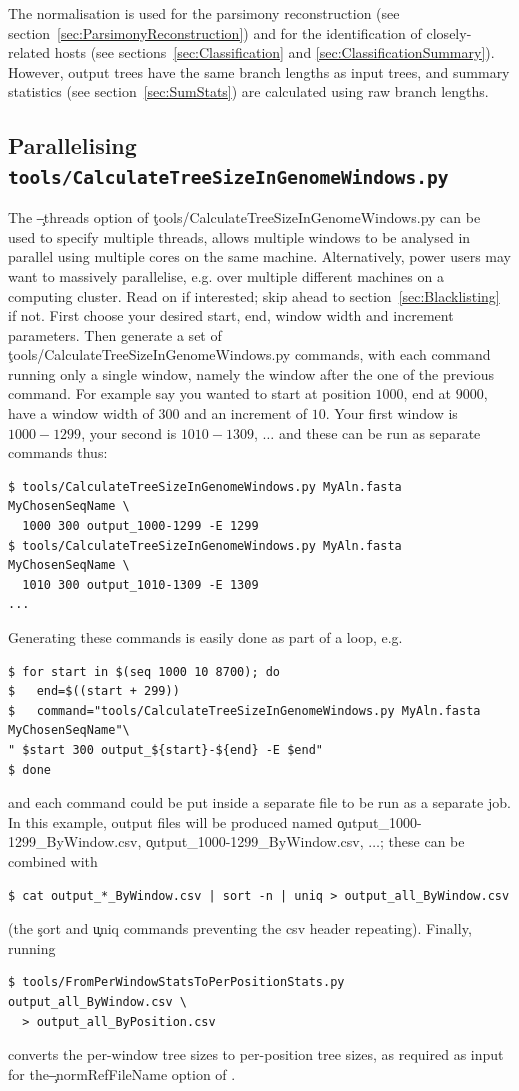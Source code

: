 The normalisation is used for the parsimony reconstruction (see section~\ref{sec:ParsimonyReconstruction}) and for the identification of closely-related hosts (see sections~\ref{sec:Classification} and \ref{sec:ClassificationSummary}). However, output trees have the same branch lengths as input trees, and summary statistics (see section~\ref{sec:SumStats}) are calculated using raw branch lengths.

\subsection{Parallelising \texttt{tools/CalculateTreeSizeInGenomeWindows.py}}
The \c{--threads} option of \c{tools/CalculateTreeSizeInGenomeWindows.py} can be used to specify multiple threads, allows multiple windows to be analysed in parallel using multiple cores on the same machine.
Alternatively, power users may want to massively parallelise, e.g. over multiple different machines on a computing cluster.
Read on if interested; skip ahead to section~\ref{sec:Blacklisting} if not.
First choose your desired start, end, window width and increment parameters.
Then generate a set of \\\c{tools/CalculateTreeSizeInGenomeWindows.py} commands, with each command running only a single window, namely the window after the one of the previous command.
For example say you wanted to start at position $1000$, end at $9000$, have a window width of $300$ and an increment of $10$.
Your first window is $1000-1299$, your second is $1010-1309$, $\ldots$ and these can be run as separate commands thus:
\begin{verbatim}
$ tools/CalculateTreeSizeInGenomeWindows.py MyAln.fasta MyChosenSeqName \
  1000 300 output_1000-1299 -E 1299
$ tools/CalculateTreeSizeInGenomeWindows.py MyAln.fasta MyChosenSeqName \
  1010 300 output_1010-1309 -E 1309
...
\end{verbatim}
Generating these commands is easily done as part of a loop, e.g.
\begin{verbatim}
$ for start in $(seq 1000 10 8700); do
$   end=$((start + 299))
$   command="tools/CalculateTreeSizeInGenomeWindows.py MyAln.fasta MyChosenSeqName"\
" $start 300 output_${start}-${end} -E $end"
$ done
\end{verbatim}
and each command could be put inside a separate file to be run as a separate job.
In this example, output files will be produced named \c{output\_1000-1299\_ByWindow.csv}, \c{output\_1000-1299\_ByWindow.csv}, $\ldots$; these can be combined with
\begin{verbatim}
$ cat output_*_ByWindow.csv | sort -n | uniq > output_all_ByWindow.csv 
\end{verbatim}
(the \c{sort} and \c{uniq} commands preventing the csv header repeating).
Finally, running
\begin{verbatim}
$ tools/FromPerWindowStatsToPerPositionStats.py output_all_ByWindow.csv \
  > output_all_ByPosition.csv
\end{verbatim}
converts the per-window tree sizes to per-position tree sizes, as required as input for the\break \c{--normRefFileName} option of \pat.

